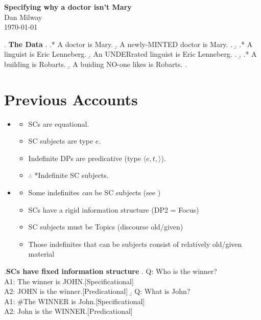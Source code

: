 \documentclass[GPFinal]{subfiles}
\begin{document}
\begin{center}
  \textbf{Specifying why a doctor isn't Mary}\\
  Dan Milway\\
  \today
\end{center}
\ex. \textbf{The Data}
\a.
\a.* A doctor is Mary.
\b. A newly-MINTED doctor is Mary.
\z.
\b.
\a.* A linguist is Eric Lenneberg.
\b. An UNDERrated linguist is Eric Lenneberg.
\z.
\b.
\a.* A building is Robarts.
\b. A buiding NO-one likes is Robarts.
\z.

\section{Previous Accounts}
\begin{itemize}
  \item \textcite{heycockkroch1999pseudocleft}
    \begin{itemize}
      \item SCs are equational.
      \item SC subjects are type $e$.
      \item Indefinite DPs are predicative (type $\langle e,t,\rangle$).
      \item $\therefore$ *Indefinite SC subjects.
    \end{itemize}
  \item \textcite{mikkelsen2004specifying}
    \begin{itemize}
      \item Some indefinites \textit{can} be SC subjects (see \Last)
      \item SCs have a rigid information structure (DP2 = Focus)
    \end{itemize}
    \begin{itemize}
      \item SC subjects must be Topics (discourse old/given)
      \item Those indefinites that can be subjects consist of relatively old/given material
    \end{itemize}
\end{itemize}
\ex.\label{ex:MikkIS}\textbf{SCs have fixed information structure}
\a. Q: Who is the winner?\\
A1: The winner is JOHN.\hfill[Specificational]\\
A2: JOHN is the winner.\hfill[Predicational]
\b. Q: What is John?\\
A1: \#The WINNER is John.\hfill[Specificational]\\
A2: John is the WINNER.\hfill[Predicational]\\
\end{document}
